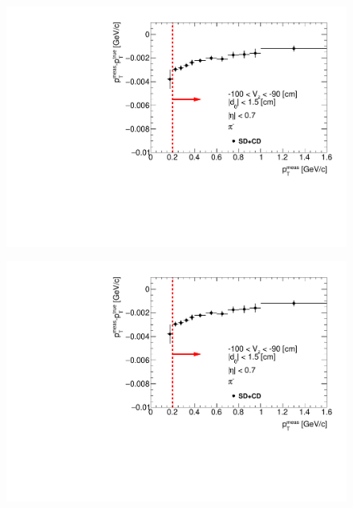 \begin{figure}[H]
{  \includegraphics[width=\linewidth,page=17]{graphics/energyLoss/energyLoss3D_OnePrtAlso.pdf}\\
}%
\end{figure}
\vspace{-3.5em}
\begin{figure}[H]\ContinuedFloat
\parbox{0.329\textwidth}{
  \includegraphics[width=\linewidth,page=18]{graphics/energyLoss/energyLoss3D_OnePrtAlso.pdf}\\
}~
\end{figure}
